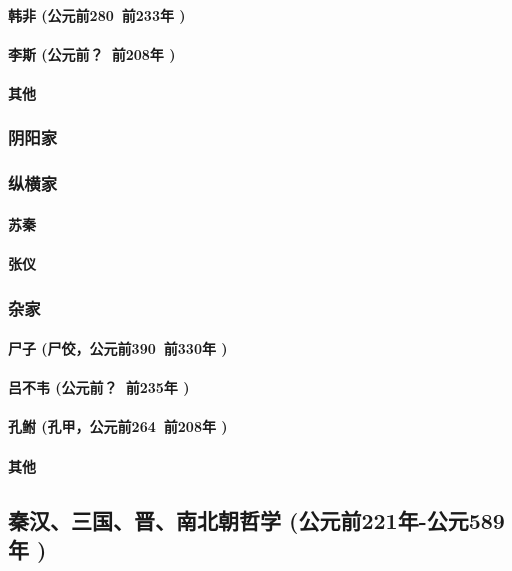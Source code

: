 \documentclass[UTF8]{../RepresentationUniverse}
\begin{document}
        \paragraph{韩非 (公元前280~前233年 )}
        \paragraph{李斯 (公元前？~前208年 )}
        \paragraph{其他}

    \subsubsection{阴阳家}
    \subsubsection{纵横家}
        \paragraph{苏秦}
        \paragraph{张仪}

    \subsubsection{杂家}
        \paragraph{尸子 (尸佼，公元前390~前330年 )}
        \paragraph{吕不韦 (公元前？~前235年 )}
        \paragraph{孔鲋 (孔甲，公元前264~前208年 )}
        \paragraph{其他}


\subsection{秦汉、三国、晋、南北朝哲学 (公元前221年-公元589年 )}
\end{document}
